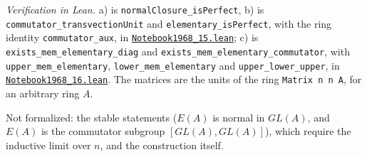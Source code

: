 \begin{sloppypar}
\noindent\emph{Verification in Lean.} a) is \texttt{normalClosure\_isPerfect}, b) is \texttt{commutator\_transvectionUnit} and \texttt{elementary\_isPerfect}, with the ring identity \texttt{commutator\_aux}, in \href{\leanblobmain/Notebook1968_15.lean}{\texttt{Notebook1968\_15.\allowbreak{}lean}}; c) is \texttt{exists\_mem\_elementary\_diag} and \texttt{exists\_mem\_elementary\_commutator}, with \texttt{upper\_mem\_elementary}, \texttt{lower\_mem\_elementary} and \texttt{upper\_lower\_upper}, in \href{\leanblobmain/Notebook1968_16.lean}{\texttt{Notebook1968\_16.\allowbreak{}lean}}. The matrices are the units of the ring \texttt{Matrix n n A}, for an arbitrary ring $A$.
\end{sloppypar}

\begin{sloppypar}\noindent Not formalized: the stable statements ($E(A)$ is normal in $GL(A)$, and $E(A)$ is the commutator subgroup $[GL(A), GL(A)]$), which require the inductive limit over $n$, and the  construction itself.
\end{sloppypar}


